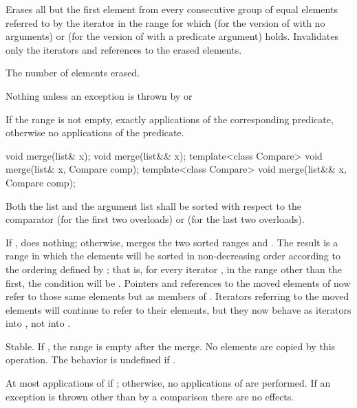 \begin{itemdescr}
\pnum
\effects
Erases all but the first element from every
consecutive group of equal elements referred to by the iterator  in the range
 for which  (for the version of
 with no arguments) or  (for the version of
 with a predicate argument) holds.
Invalidates only the iterators and references to the erased elements.

\pnum
\returns The number of elements erased.

\pnum
\throws
Nothing unless an exception is thrown by
or

\pnum
\complexity
If the range
\tcode{[first, last)}
is not empty, exactly
applications of the corresponding predicate,
otherwise no applications of the predicate.
\end{itemdescr}

%
\begin{itemdecl}
void merge(list& x);
void merge(list&& x);
template<class Compare> void merge(list& x, Compare comp);
template<class Compare> void merge(list&& x, Compare comp);
\end{itemdecl}

\begin{itemdescr}
\pnum
\requires
Both the list and the argument list
shall be sorted with respect to
the comparator  (for the first two overloads) or
 (for the last two overloads).

\pnum
\effects
If , does nothing; otherwise, merges the two sorted ranges \tcode{[begin(),
end())} and \tcode{[x.\brk{}begin(), x.end())}. The result is a range in which the elements
will be sorted in non-decreasing order according to the ordering defined by ; that
is, for every iterator , in the range other than the first, the condition
 will be .
Pointers and references to the moved elements of  now refer to those same elements
but as members of . Iterators referring to the moved elements will continue to
refer to their elements, but they now behave as iterators into , not into
.

\pnum
\remarks Stable. If , the range \tcode{[x.begin(), x.end())}
is empty after the merge.
No elements are copied by this operation. The behavior is undefined if
.

\pnum
\complexity
At most
applications of  if
;
otherwise, no applications of  are performed.
If an exception is thrown other than by a comparison there are no effects.
\end{itemdescr}

